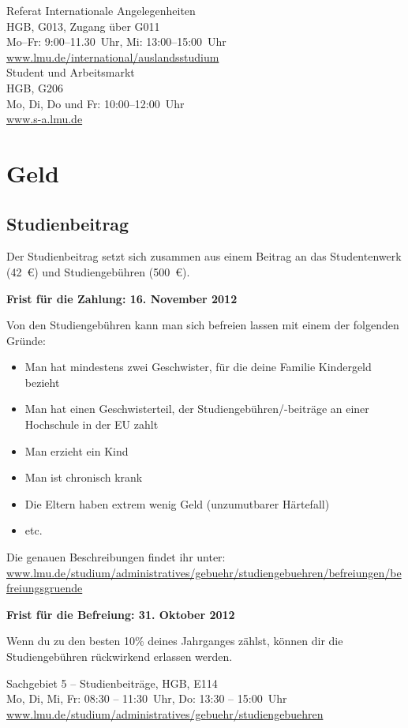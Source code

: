 \documentclass[twoside,12pt,parskip=half-]{scrartcl}
\begin{document}
Referat Internationale Angelegenheiten\\
HGB, G013, Zugang über G011\\
Mo--Fr: 9:00--11.30~Uhr, Mi: 13:00--15:00~Uhr\\
\url{www.lmu.de/international/auslandsstudium}\\


Student und Arbeitsmarkt\\
HGB, G206\\
Mo, Di, Do und Fr: 10:00--12:00~Uhr\\
\url{www.s-a.lmu.de}


\clearpage

\section{Geld}

\subsection{Studienbeitrag}
Der Studienbeitrag setzt sich zusammen aus einem Beitrag an das Studentenwerk (42~€) und Studiengebühren (500~€).

\textbf{Frist für die Zahlung: 16. November 2012}

Von den Studiengebühren kann man sich befreien lassen mit einem der
folgenden Gründe:
\begin{itemize}
        \item Man hat mindestens zwei Geschwister, für die deine Familie
          Kindergeld bezieht
	\item Man hat einen Geschwisterteil, der Studiengebühren/-beiträge an einer Hochschule in der EU zahlt
	\item Man erzieht ein Kind
	\item Man ist chronisch krank
	\item Die Eltern haben extrem wenig Geld (unzumutbarer Härtefall)
	\item etc.
\end{itemize}

Die genauen Beschreibungen findet ihr unter: \url{www.lmu.de/studium/administratives/gebuehr/studiengebuehren/befreiungen/befreiungsgruende}

\textbf{Frist für die Befreiung: 31. Oktober 2012}

Wenn du zu den besten 10\% deines Jahrganges zählst, können dir die
Studiengebühren rückwirkend erlassen werden.

Sachgebiet 5 -- Studienbeiträge, HGB, E114\\
Mo, Di, Mi, Fr: 08:30 -- 11:30~Uhr, Do: 13:30 -- 15:00~Uhr\\
\url{www.lmu.de/studium/administratives/gebuehr/studiengebuehren}
\end{document}
